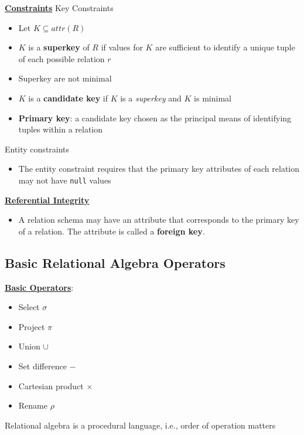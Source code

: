 \textbf{\underline{Constraints}}
\bigskip
Key Constraints \label{keyConstraints}
\begin{itemize}[label=\(\rhd\)]
    \item Let $K\subseteq attr(R)$
    \item $K$ is a \textbf{superkey} of $R$ if values for $K$ are sufficient to identify a unique tuple of each possible relation $r$
    \item Superkey are not minimal
    \item $K$ is a \textbf{candidate key} if $K$ is a \textit{superkey} and $K$ is minimal
    \item \textbf{Primary key}: a candidate key chosen as the principal means of identifying tuples within a relation
\end{itemize}
Entity constraints
\begin{itemize}[label=\(\rhd\)]
    \item The entity constraint requires that the primary key attributes of each relation may not have \texttt{null} values
\end{itemize}
\textbf{\underline{Referential Integrity}}
\bigskip
\begin{itemize}[label=\(\rhd\)]
    \item A relation schema may have an attribute that corresponds to the primary key of a relation. The attribute is called a \textbf{foreign key}.
\end{itemize}

\subsection{Basic Relational Algebra Operators}

\textbf{\underline{Basic Operators}}:
\begin{itemize}[label=\(\rhd\)]
    \item Select $\sigma$
    \item Project $\pi$
    \item Union $\cup$
    \item Set difference $-$
    \item Cartesian product $\times$
    \item Rename $\rho$
\end{itemize}

Relational algebra is a procedural language, i.e., order of operation matters

